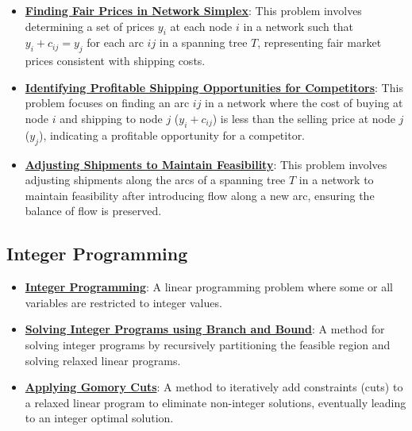 \documentclass{article}%
\begin{document}
\begin{itemize}[leftmargin=*]
\item \href{https://www.math.purdue.edu/~yipn/421/2024-11-21-EconNetSimplex.pdf#page=4}{\textbf{Finding Fair Prices in Network Simplex}}: This problem involves determining a set of prices $y_i$ at each node $i$ in a network such that $y_i + c_{ij} = y_j$ for each arc $ij$ in a spanning tree $T$, representing fair market prices consistent with shipping costs.%
\item \href{https://www.math.purdue.edu/~yipn/421/2024-11-21-EconNetSimplex.pdf#page=5}{\textbf{Identifying Profitable Shipping Opportunities for Competitors}}: This problem focuses on finding an arc $ij$ in a network where the cost of buying at node $i$ and shipping to node $j$ ($y_i + c_{ij}$) is less than the selling price at node $j$ ($y_j$), indicating a profitable opportunity for a competitor.%
\item \href{https://www.math.purdue.edu/~yipn/421/2024-11-21-EconNetSimplex.pdf#page=6}{\textbf{Adjusting Shipments to Maintain Feasibility}}: This problem involves adjusting shipments along the arcs of a spanning tree $T$ in a network to maintain feasibility after introducing flow along a new arc, ensuring the balance of flow is preserved.%
\end{itemize}

%
\subsection{Integer Programming}%
\label{subsec:IntegerProgramming}%
\begin{itemize}[leftmargin=*]%
\item \href{https://www.math.purdue.edu/~yipn/421/2024-10-31-IntLinProg.pdf#page=1}{\textbf{Integer Programming}}: A linear programming problem where some or all variables are restricted to integer values.%
\item \href{https://www.math.purdue.edu/~yipn/421/2024-10-31-IntLinProg.pdf#page=5}{\textbf{Solving Integer Programs using Branch and Bound}}: A method for solving integer programs by recursively partitioning the feasible region and solving relaxed linear programs.%
\item \href{https://www.math.purdue.edu/~yipn/421/2024-10-31-IntLinProg.pdf#page=15}{\textbf{Applying Gomory Cuts}}: A method to iteratively add constraints (cuts) to a relaxed linear program to eliminate non-integer solutions, eventually leading to an integer optimal solution.%
\end{itemize}

%
\end{document}
